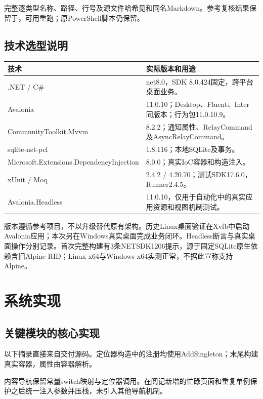 \documentclass[UTF8,a4paper,11pt,fontset=none]{ctexart}
\begin{document}
完整逐类型名称、路径、行号及源文件哈希见和同名Markdown。参考复核结果保留于，可用重跑；原PowerShell脚本仍保留。
\subsection{技术选型说明}
\begin{longtable}{p{52mm}p{87mm}}\toprule 技术 & 实际版本和用途\\\midrule
.NET / C\# & net8.0，SDK 8.0.424固定，跨平台桌面业务。\\
Avalonia & 11.0.10；Desktop、Fluent、Inter同版本；行为包11.0.10.9。\\
CommunityToolkit.Mvvm & 8.2.2；通知属性、RelayCommand及AsyncRelayCommand。\\
sqlite-net-pcl & 1.8.116；本地SQLite及事务。\\
Microsoft.Extensions.\newline DependencyInjection & 8.0.0；真实IoC容器和构造注入。\\
xUnit / Moq & 2.4.2 / 4.20.70；测试SDK17.6.0，Runner2.4.5。\\
Avalonia.Headless & 11.0.10，仅用于自动化中的真实应用资源和视图机制测试。\\\bottomrule
\end{longtable}

版本遵循参考项目，不以升级替代原有架构。历史Linux桌面验证在Xvfb中启动Avalonia应用；本次另在Windows真实桌面完成业务闭环。Headless断言与真实桌面操作分别记录。首次完整构建有3条NETSDK1206提示，源于固定SQLite原生依赖含旧Alpine RID；Linux x64与Windows x64实测正常，不据此宣称支持Alpine。
\section{系统实现}
\subsection{关键模块的核心实现}
以下摘录直接来自交付源码。定位器构造中的注册均使用AddSingleton；末尾构建真实容器，属性由容器解析。

内容导航保留常量switch映射与定位器调用。在阅记新增的忙碌页面和重复单例保护之后统一注入参数并压栈，未引入其他导航机制。
\end{document}
